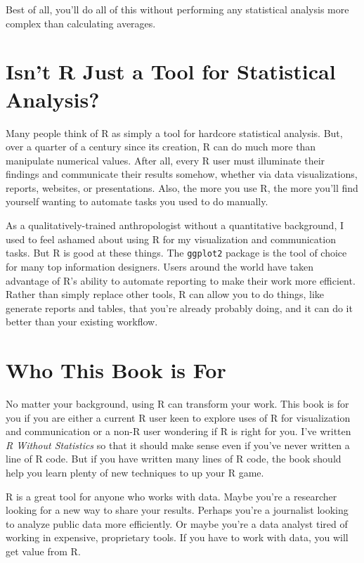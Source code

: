 \documentclass[
]{book}
\begin{document}
Best of all, you'll do all of this without performing any statistical analysis more complex than calculating averages.

\hypertarget{isnt-r-just-a-tool-for-statistical-analysis}{%
\section*{Isn't R Just a Tool for Statistical Analysis?}\label{isnt-r-just-a-tool-for-statistical-analysis}}

Many people think of R as simply a tool for hardcore statistical analysis. But, over a quarter of a century since its creation, R can do much more than manipulate numerical values. After all, every R user must illuminate their findings and communicate their results somehow, whether via data visualizations, reports, websites, or presentations. Also, the more you use R, the more you'll find yourself wanting to automate tasks you used to do manually.

As a qualitatively-trained anthropologist without a quantitative background, I used to feel ashamed about using R for my visualization and communication tasks. But R is good at these things. The \texttt{ggplot2} package is the tool of choice for many top information designers. Users around the world have taken advantage of R's ability to automate reporting to make their work more efficient. Rather than simply replace other tools, R can allow you to do things, like generate reports and tables, that you're already probably doing, and it can do it better than your existing workflow.

\hypertarget{who-this-book-is-for}{%
\section*{Who This Book is For}\label{who-this-book-is-for}}

No matter your background, using R can transform your work. This book is for you if you are either a current R user keen to explore uses of R for visualization and communication or a non-R user wondering if R is right for you. I've written \emph{R Without Statistics} so that it should make sense even if you've never written a line of R code. But if you have written many lines of R code, the book should help you learn plenty of new techniques to up your R game.

R is a great tool for anyone who works with data. Maybe you're a researcher looking for a new way to share your results. Perhaps you're a journalist looking to analyze public data more efficiently. Or maybe you're a data analyst tired of working in expensive, proprietary tools. If you have to work with data, you will get value from R.
\end{document}
